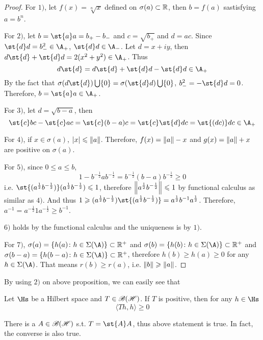 \begin{proof}
	For $1)$, let $f(x)= \sqrt[n]{x}$ defined on $\sigma(a) \subset \mathbb{R}$, then $b=f(a)$ sastisfying $ a = b^{n}$.
	\item For $2)$, let $b = \st{a}a = b_{+} - b_{-}$ and $c = \sqrt{b_{+}}$  and $d=ac$. Since $\st{d}d = b_{-}^2 \in \A_{+}$, $\st{d}d \in \A_{-}$. Let $d = x + iy$, then $d\st{d} + \st{d}d = 2(x^2+y^2) \in \A_{+}$. Thus
	\begin{equation*}
		d\st{d} = d\st{d} + \st{d}d -\st{d}d \in \A_{+}
	\end{equation*}
	By the fact that $\sigma(d\st{d})\bigcup\{0\} = \sigma(\st{d}d)\bigcup\{0\}$, $b_{-}^2 = -\st{d}d =0$. Therefore, $b = \st{a}a \in \A_{+}$.
	\item For $3)$, let $d = \sqrt{b-a}$, then 
	\begin{equation*}
		\st{c}bc - \st{c}ac = \st{c}(b-a)c = \st{c}\st{d}dc = \st{(dc)}dc \in \A_{+}
 	\end{equation*}
 	\item For $4)$, if $x \in \sigma(a)$, $\left\lvert x\right\lvert \leqslant \left\lVert a\right\lVert$. Therefore, $f(x) = \left\lVert a\right\lVert-x$ and $g(x) = \left\lVert a\right\lVert+x$ are positive on $\sigma(a)$.
 	\item For $5)$, since $0 \leqslant a \leqslant b$,
 	\begin{equation*}
 		1-b^{-\frac{1}{2}}ab^{-\frac{1}{2}} = b^{-\frac{1}{2}}(b-a)b^{-\frac{1}{2}} \geqslant 0
 	\end{equation*}
 	i.e. $\st{(a^{\frac{1}{2}} b^{-\frac{1}{2}})}(a^{\frac{1}{2}} b^{-\frac{1}{2}}) \leqslant 1$, therefore $\left\lVert a^{\frac{1}{2}} b^{-\frac{1}{2}}\right\lVert \leqslant 1$ by functional calculus as similar as $4)$. And thus $1 \geqslant (a^{\frac{1}{2}} b^{-\frac{1}{2}})\st{(a^{\frac{1}{2}} b^{-\frac{1}{2}})} = a^{\frac{1}{2}}b^{-1}a^{\frac{1}{2}}$. Therefore, $a^{-1}=a^{-\frac{1}{2}}1a^{-\frac{1}{2}} \geqslant b^{-1}$.
 	\item $6)$ holds by the functional calculus and the uniqueness is by $1)$.
 	\item For $7)$, $\sigma(a) = \{h(a) \colon h \in \Sigma(\A)\} \subset \R^{+}$ and $\sigma(b) = \{h(b) \colon h \in \Sigma(\A)\} \subset \R^{+}$ and $\sigma(b-a) = \{h(b-a) \colon h \in \Sigma(\A)\} \subset \R^{+}$, therefore $h(b) \geqslant h(a) \geqslant 0$ for any $h \in \Sigma(\A)$. That means $r(b) \geqslant r(a)$, i.e. $\left\lVert b\right\lVert \geqslant \left\lVert a\right\lVert$.
\end{proof}

By using $2)$ on above proposition, we can easily see that
\begin{cor}
	Let $\Hs$ be a Hilbert space and $T \in \mathscr{B(H)}$. If $T$ is positive, then for any $h \in \Hs$
	\begin{equation*}
		\langle Th,h \rangle \geqslant 0
	\end{equation*}
\end{cor}
\begin{rem}
	There is a $A \in \mathscr{B(H)}$ s.t. $T=\st{A}A$, thus above statement is true. In fact, the converse is also true.
\end{rem}

